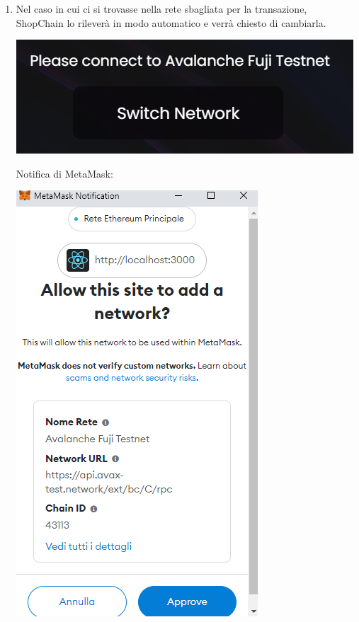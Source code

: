 \begin{enumerate}
\item Nel caso in cui ci si trovasse nella rete sbagliata per la transazione, ShopChain lo rileverà in modo automatico e verrà chiesto di cambiarla. \\



\begin{center}
\includegraphics[scale = 0.5]{img/SwitchNetwork.PNG}\\
\end{center}

Notifica di MetaMask:\\
\begin{center}
\includegraphics[scale = 0.5]{img/SwitchNetworkMetamask.PNG}
\end{center}


\end{enumerate}

